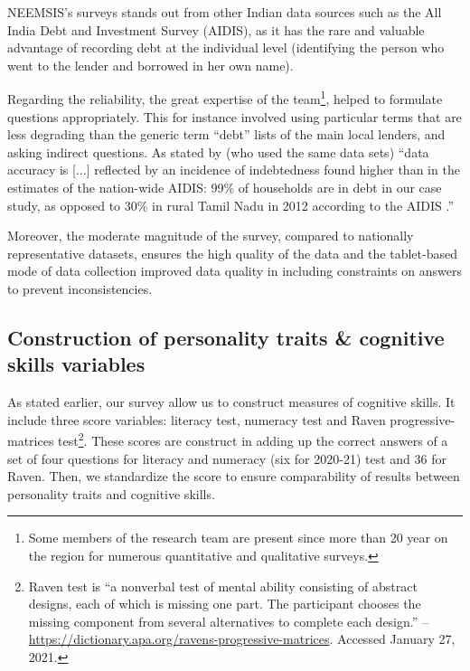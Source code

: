 \documentclass[a4paper, 11pt, onecolumn]{article}
\begin{document}
NEEMSIS's surveys stands out from other Indian data sources such as the All India Debt and Investment Survey (AIDIS), as it has the rare and valuable advantage of recording debt at the individual level (identifying the person who went to the lender and borrowed in her own name).

Regarding the reliability, the great expertise of the team\footnote{Some members of the research team are present since more than 20 year on the region for numerous quantitative and qualitative surveys.}, helped to formulate questions appropriately.
This for instance involved using particular terms that are less degrading than the generic term ``debt'' lists of the main local lenders, and asking indirect questions.
As stated by \cite{Reboul2021} (who used the same data sets) ``data accuracy is [...] reflected by an incidence of indebtedness found higher than in the estimates of the nation-wide AIDIS: 99\% of households are in debt in our case study, as opposed to 30\% in rural Tamil Nadu in 2012 according to the AIDIS \citep{NSSO2014}.'' 

Moreover, the moderate magnitude of the survey, compared to nationally representative datasets, ensures the high quality of the data and the tablet-based mode of data collection improved data quality in including constraints on answers to prevent inconsistencies. 




	\subsection{Construction of personality traits \& cognitive skills variables }

As stated earlier, our survey allow us to construct measures of cognitive skills.
It include three score variables: literacy test, numeracy test and Raven progressive-matrices test\footnote{Raven test is ``a nonverbal test of mental ability consisting of abstract designs, each of which is missing one part. The participant chooses the missing component from several alternatives to complete each design.'' -- \url{https://dictionary.apa.org/ravens-progressive-matrices}. Accessed January 27, 2021.}.
These scores are construct in adding up the correct answers of a set of four questions for literacy and numeracy (six for 2020-21) test and 36 for Raven.
Then, we standardize the score to ensure comparability of results between personality traits and cognitive skills.
\end{document}
